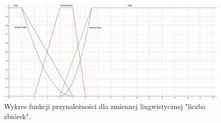 \documentclass{classrep}
\begin{document}
\begin{enumerate}
    \begin{figure}[H]
        \centering
        \includegraphics[width=14cm]{wykres_zbiorki.png}
        \caption{Wykres funkcji przynależności dla zmiennej lingwistycznej "liczba zbiórek".}
        \label{rysunek:zbiorki}
    \end{figure}
    

\end{enumerate}
\end{document}
